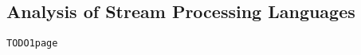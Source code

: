 \subsection{Analysis of Stream Processing Languages}

\begin{alltt}TODO\scriptsize 1 page
\end{alltt}

